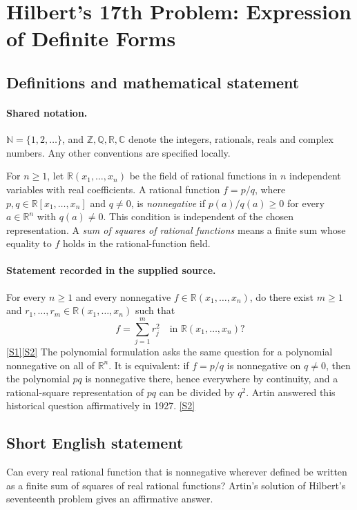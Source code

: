 \documentclass[11pt]{article}
\newcommand{\sref}[2]{\hyperlink{source:#1:#2}{[S#2]}}
\begin{document}
\section{Hilbert's 17th Problem: Expression of Definite Forms}\label{statement}

\subsection{Definitions and mathematical statement}

\paragraph{Shared notation.}$\mathbb N=\{1,2,\ldots\}$, and $\mathbb Z,\mathbb Q,\mathbb R,\mathbb C$ denote the integers, rationals, reals and complex numbers. Any other conventions are specified locally.


For $n\ge1$, let $\mathbb R(x_1,\ldots,x_n)$ be the field of rational functions in $n$ independent variables with real coefficients. A rational function $f=p/q$, where $p,q\in\mathbb R[x_1,\ldots,x_n]$ and $q\ne0$, is \emph{nonnegative} if $p(a)/q(a)\ge0$ for every $a\in\mathbb R^n$ with $q(a)\ne0$. This condition is independent of the chosen representation. A \emph{sum of squares of rational functions} means a finite sum whose equality to $f$ holds in the rational-function field.
\paragraph{Statement recorded in the supplied source.}
For every $n\ge1$ and every nonnegative $f\in\mathbb R(x_1,\ldots,x_n)$, do there exist $m\ge1$ and $r_1,\ldots,r_m\in\mathbb R(x_1,\ldots,x_n)$ such that
\[
f=\sum_{j=1}^{m}r_j^2\quad\text{in }\mathbb R(x_1,\ldots,x_n)?
\]
\sref{statement}{1}\sref{statement}{2}
The polynomial formulation asks the same question for a polynomial nonnegative on all of $\mathbb R^n$. It is equivalent: if $f=p/q$ is nonnegative on $q\ne0$, then the polynomial $pq$ is nonnegative there, hence everywhere by continuity, and a rational-square representation of $pq$ can be divided by $q^2$. Artin answered this historical question affirmatively in 1927. \sref{statement}{2}
\subsection{Short English statement}
Can every real rational function that is nonnegative wherever defined be written as a finite sum of squares of real rational functions? Artin's solution of Hilbert's seventeenth problem gives an affirmative answer.
\end{document}
